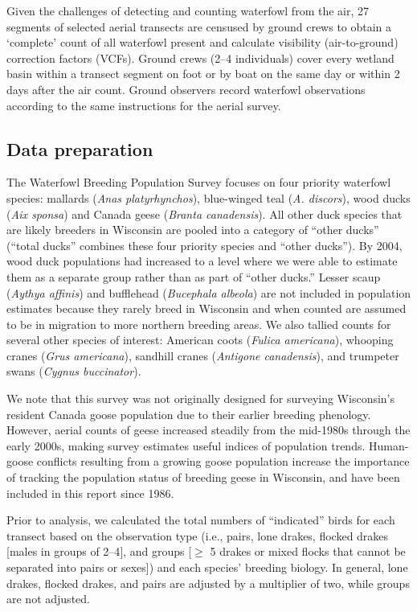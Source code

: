 \documentclass[
  12pt,
]{article}
\begin{document}
Given the challenges of detecting and counting waterfowl from the air,
27 segments of selected aerial transects are censused by ground crews to
obtain a `complete' count of all waterfowl present and calculate
visibility (air-to-ground) correction factors (VCFs). Ground crews (2--4
individuals) cover every wetland basin within a transect segment on foot
or by boat on the same day or within 2 days after the air count. Ground
observers record waterfowl observations according to the same
instructions for the aerial survey.

\hypertarget{data-preparation}{%
\subsection{Data preparation}\label{data-preparation}}

The Waterfowl Breeding Population Survey focuses on four priority
waterfowl species: mallards (\emph{Anas platyrhynchos}), blue-winged
teal (\emph{A. discors}), wood ducks (\emph{Aix sponsa}) and Canada
geese (\emph{Branta canadensis}). All other duck species that are likely
breeders in Wisconsin are pooled into a category of ``other ducks''
(``total ducks'' combines these four priority species and ``other
ducks''). By 2004, wood duck populations had increased to a level where
we were able to estimate them as a separate group rather than as part of
``other ducks.'' Lesser scaup (\emph{Aythya affinis}) and bufflehead
(\emph{Bucephala albeola}) are not included in population estimates
because they rarely breed in Wisconsin and when counted are assumed to
be in migration to more northern breeding areas. We also tallied counts
for several other species of interest: American coots (\emph{Fulica
americana}), whooping cranes (\emph{Grus americana}), sandhill cranes
(\emph{Antigone canadensis}), and trumpeter swans (\emph{Cygnus
buccinator}).

We note that this survey was not originally designed for surveying
Wisconsin's resident Canada goose population due to their earlier
breeding phenology. However, aerial counts of geese increased steadily
from the mid-1980s through the early 2000s, making survey estimates
useful indices of population trends. Human-goose conflicts resulting
from a growing goose population increase the importance of tracking the
population status of breeding geese in Wisconsin, and have been included
in this report since 1986.

Prior to analysis, we calculated the total numbers of ``indicated''
birds for each transect based on the observation type (i.e., pairs, lone
drakes, flocked drakes {[}males in groups of 2--4{]}, and groups
{[}\(\geq\) 5 drakes or mixed flocks that cannot be separated into pairs
or sexes{]}) and each species' breeding biology. In general, lone
drakes, flocked drakes, and pairs are adjusted by a multiplier of two,
while groups are not adjusted.
\end{document}
